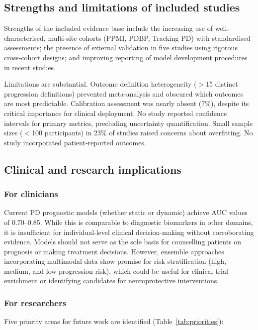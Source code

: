 \documentclass[11pt,a4paper]{article}
\begin{document}
\subsection{Strengths and limitations of included studies}

Strengths of the included evidence base include the increasing use of well-characterised, multi-site cohorts (PPMI, PDBP, Tracking PD) with standardised assessments; the presence of external validation in five studies using rigorous cross-cohort designs; and improving reporting of model development procedures in recent studies.

Limitations are substantial. Outcome definition heterogeneity ($>$15 distinct progression definitions) prevented meta-analysis and obscured which outcomes are most predictable. Calibration assessment was nearly absent (7\%), despite its critical importance for clinical deployment. No study reported confidence intervals for primary metrics, precluding uncertainty quantification. Small sample sizes ($<$100 participants) in 23\% of studies raised concerns about overfitting. No study incorporated patient-reported outcomes.

\subsection{Clinical and research implications}

\subsubsection{For clinicians}
Current PD prognostic models (whether static or dynamic) achieve AUC values of 0.70--0.85. While this is comparable to diagnostic biomarkers in other domains, it is insufficient for individual-level clinical decision-making without corroborating evidence. Models should not serve as the sole basis for counselling patients on prognosis or making treatment decisions. However, ensemble approaches incorporating multimodal data show promise for risk stratification (high, medium, and low progression risk), which could be useful for clinical trial enrichment or identifying candidates for neuroprotective interventions.

\subsubsection{For researchers}
Five priority areas for future work are identified (Table~\ref{tab:priorities}):
\end{document}

